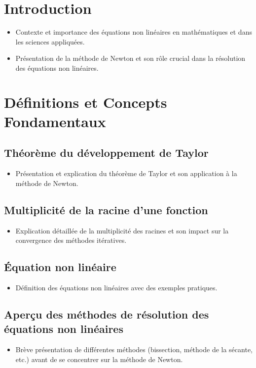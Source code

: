 \documentclass{article}
\begin{document}
\tableofcontents
\newpage

\section{Introduction}
\begin{itemize}
    \item Contexte et importance des équations non linéaires en mathématiques et dans les sciences appliquées.
    \item Présentation de la méthode de Newton et son rôle crucial dans la résolution des équations non linéaires.
\end{itemize}

\section{Définitions et Concepts Fondamentaux}
\subsection{Théorème du développement de Taylor}
\begin{itemize}
    \item Présentation et explication du théorème de Taylor et son application à la méthode de Newton.
\end{itemize}
\subsection{Multiplicité de la racine d'une fonction}
\begin{itemize}
    \item Explication détaillée de la multiplicité des racines et son impact sur la convergence des méthodes itératives.
\end{itemize}
\subsection{Équation non linéaire}
\begin{itemize}
    \item Définition des équations non linéaires avec des exemples pratiques.
\end{itemize}
\subsection{Aperçu des méthodes de résolution des équations non linéaires}
\begin{itemize}
    \item Brève présentation de différentes méthodes (bissection, méthode de la sécante, etc.) avant de se concentrer sur la méthode de Newton.
\end{itemize}
\end{document}
